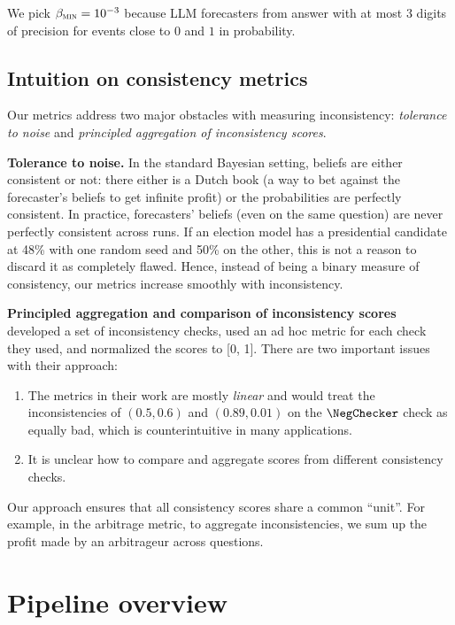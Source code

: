 We pick $\beta_{\textsc{min}} = 10^{-3}$ because LLM forecasters from \citet{halawiApproachingHumanLevelForecasting2024} answer with at most 3 digits of precision for events close to $0$ and $1$ in probability.

\subsection{Intuition on consistency metrics}

Our metrics address two major obstacles with measuring inconsistency: \emph{tolerance to noise} and \emph{principled aggregation of inconsistency scores}.

\textbf{Tolerance to noise.}
In the standard Bayesian setting, beliefs are either consistent or not: there either is a Dutch book (a way to bet against the forecaster's beliefs to get infinite profit) or the probabilities are perfectly consistent.
In practice, forecasters' beliefs (even on the same question) are never perfectly consistent across runs. If an election model has a presidential candidate at 48\% with one random seed and 50\% on the other, this is not a reason to discard it as completely flawed. Hence, instead of being a binary measure of consistency, our metrics increase smoothly with inconsistency.

\textbf{Principled aggregation and comparison of inconsistency scores}
\citep{esmwcc} developed a set of inconsistency checks, used an ad hoc metric for each check they used, and normalized the scores to [0, 1].
There are two important issues with their approach:
\begin{enumerate}
    \item The metrics in their work are mostly \emph{linear} and would treat the inconsistencies of $(0.5, 0.6)$ and $(0.89, 0.01)$ on the $\NegChecker$ check as equally bad, which is counterintuitive in many applications.
    \item It is unclear how to compare and aggregate scores from different consistency checks.
\end{enumerate}
Our approach ensures that all consistency scores share a common ``unit''. For example, in the arbitrage metric, to aggregate inconsistencies, we sum up the profit made by an arbitrageur across questions.


\section{Pipeline overview}
\label{cfc:sec:pipeline}


